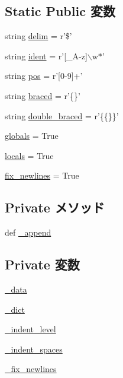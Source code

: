 \subsection*{Static Public 変数}
\begin{DoxyCompactItemize}
\item 
string \hyperlink{classm5_1_1util_1_1code__formatter_1_1code__formatter_abdf1a4a33a9d235558cece7270cdd6af}{delim} = r'\$'
\item 
string \hyperlink{classm5_1_1util_1_1code__formatter_1_1code__formatter_ac8e708e2cf89b2a2ebf3794f26dc6095}{ident} = r'\mbox{[}\_\-A-\/z\mbox{]}$\backslash$w$\ast$'
\item 
string \hyperlink{classm5_1_1util_1_1code__formatter_1_1code__formatter_a93e2145e83eedf4c13a83d488855d126}{pos} = r'\mbox{[}0-\/9\mbox{]}+'
\item 
string \hyperlink{classm5_1_1util_1_1code__formatter_1_1code__formatter_a935da82b8051a1db1c662d8e4bd75e58}{braced} = r'\{\}'
\item 
string \hyperlink{classm5_1_1util_1_1code__formatter_1_1code__formatter_af6860356c79d14b959158766081ef166}{double\_\-braced} = r'\{\{\}\}'
\item 
\hyperlink{classm5_1_1util_1_1code__formatter_1_1code__formatter_a3841b371491431ea781322cdfd09e820}{globals} = True
\item 
\hyperlink{classm5_1_1util_1_1code__formatter_1_1code__formatter_a6048b6762294d5f06201009395e1af36}{locals} = True
\item 
\hyperlink{classm5_1_1util_1_1code__formatter_1_1code__formatter_a5f0c1c3b911edcb66ec1dfaf3bbb8307}{fix\_\-newlines} = True
\end{DoxyCompactItemize}
\subsection*{Private メソッド}
\begin{DoxyCompactItemize}
\item 
def \hyperlink{classm5_1_1util_1_1code__formatter_1_1code__formatter_a390a34f39790d0e031ed841449561551}{\_\-append}
\end{DoxyCompactItemize}
\subsection*{Private 変数}
\begin{DoxyCompactItemize}
\item 
\hyperlink{classm5_1_1util_1_1code__formatter_1_1code__formatter_af44f009a2e927706d2885759c915072a}{\_\-data}
\item 
\hyperlink{classm5_1_1util_1_1code__formatter_1_1code__formatter_a4d2dd191e958f6b142f60e7f94ce0dd0}{\_\-dict}
\item 
\hyperlink{classm5_1_1util_1_1code__formatter_1_1code__formatter_ad93c7ef9c0d18c6750482bd9804327e3}{\_\-indent\_\-level}
\item 
\hyperlink{classm5_1_1util_1_1code__formatter_1_1code__formatter_a6b659004590c2109ccc96a5861e9fdf2}{\_\-indent\_\-spaces}
\item 
\hyperlink{classm5_1_1util_1_1code__formatter_1_1code__formatter_a1a85539ed117b8e2d3199998abb8d5f8}{\_\-fix\_\-newlines}
\end{DoxyCompactItemize}
